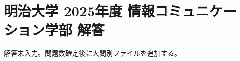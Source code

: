 \documentclass[../../uem_mat_mei_a.tex]{subfiles}
\begin{document}
    \section{明治大学 2025年度 情報コミュニケーション学部 解答}

    解答未入力。問題数確定後に大問別ファイルを追加する。
\end{document}
